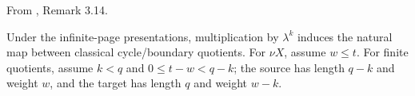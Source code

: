 \begin{proposition}
\label{sem:Literature:infinite-lambda}
From \cite{LWX126}, Remark 3.14.\par

Under the infinite-page presentations, multiplication by $\lambda^k$ induces the natural map between classical cycle/boundary quotients. For $\nu X$, assume $w\le t$. For finite quotients, assume $k<q$ and $0\le t-w<q-k$; the source has length $q-k$ and weight $w$, and the target has length $q$ and weight $w-k$.
\end{proposition}

